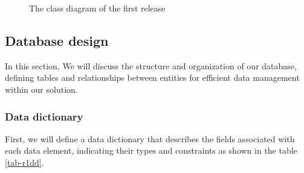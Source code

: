 \begin{figure}[hbt!]
    \centering
    
    \caption{The class diagram of the first release}
    \label{r1-class}
\end{figure}

\subsection{Database design}
In this section, We will discuss the structure and organization of our database, defining tables and relationships
between entities for efficient data management within our solution.

\subsubsection{Data dictionary}

First, we will define a data dictionary that describes the fields associated with each data element,
indicating their types and constraints as shown in the table \ref{tab-r1dd}.

